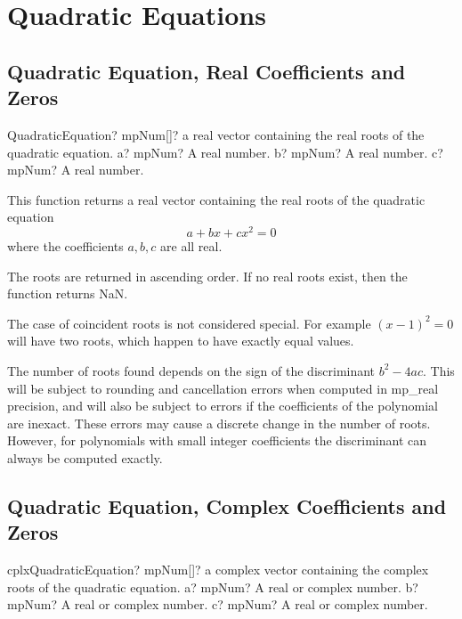 \section{Quadratic Equations}
\label{QuadraticEquationsPolynomials}

\subsection{Quadratic Equation, Real Coefficients and Zeros}

\begin{mpFunctionsExtract}
	\mpFunctionThree
	{QuadraticEquation? mpNum[]? a real vector containing the real roots of the quadratic equation.}
	{a? mpNum? A real number.}
	{b? mpNum? A real number.}
	{c? mpNum? A real number.}
\end{mpFunctionsExtract}


\vspace{0.3cm}

This function returns a real vector containing the real roots of the quadratic equation
\begin{equation}
a  + b x + c x^2  = 0
\end{equation}
where the coefficients $a, b, c$ are all real. 

The roots are returned in ascending order. If no real roots exist, then the function returns NaN.

The case of coincident roots is not considered special. For example $(x - 1)^2 = 0$ will have two roots, which happen to have exactly equal values.

The number of roots found depends on the sign of the discriminant $b^2 - 4ac$. This will be subject to rounding and cancellation errors when computed in mp\_real precision, and will also be subject to errors if the coefficients of the polynomial are inexact. These errors may cause a discrete change in the number of roots. However, for polynomials with small integer coefficients the discriminant can always be computed exactly.



\subsection{Quadratic Equation, Complex Coefficients and Zeros}

\begin{mpFunctionsExtract}
	\mpFunctionThree
	{cplxQuadraticEquation? mpNum[]? a complex vector containing the complex roots of the quadratic equation.}
	{a? mpNum? A real or complex number.}
	{b? mpNum? A real or complex number.}
	{c? mpNum? A real or complex number.}
\end{mpFunctionsExtract}



